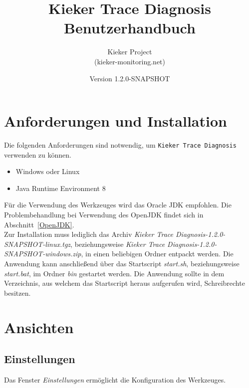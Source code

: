 \documentclass{article}
\begin{document}
  \newcommand{\version}[0]{1.2.0-SNAPSHOT}
  \newcommand{\KiekerTraceDiagnosis}[0]{\texttt{Kieker Trace Diagnosis}}
  \newcommand{\file}[1]{\textit{#1}}

  \title{Kieker Trace Diagnosis\\Benutzerhandbuch}
  \date{Version \version{}}
  \author{Kieker Project\\(kieker-monitoring.net)}

  \maketitle

  \section{Anforderungen und Installation}
  Die folgenden Anforderungen sind notwendig, um \KiekerTraceDiagnosis{} verwenden zu können.
  \begin{itemize}
    \item Windows oder Linux
    \item Java Runtime Environment 8
  \end{itemize}
  Für die Verwendung des Werkzeuges wird das Oracle JDK empfohlen. Die Problembehandlung bei Verwendung des OpenJDK findet sich in Abschnitt~\ref{OpenJDK}.\\

  Zur Installation muss lediglich das Archiv \file{Kieker Trace Diagnosis-\version{}-linux.tgz}, beziehungsweise \file{Kieker Trace Diagnosis-\version{}-windows.zip}, in einen beliebigen Ordner entpackt werden.
  Die Anwendung kann anschließend über das Startscript \file{start.sh}, beziehungsweise \file{start.bat}, im Ordner \file{bin} gestartet werden.
  Die Anwendung sollte in dem Verzeichnis, aus welchem das Startscript heraus aufgerufen wird, Schreibrechte besitzen.

  \section{Ansichten}

  \subsection{Einstellungen}

  Das Fenster \textit{Einstellungen} ermöglicht die Konfiguration des Werkzeuges.
\end{document}
